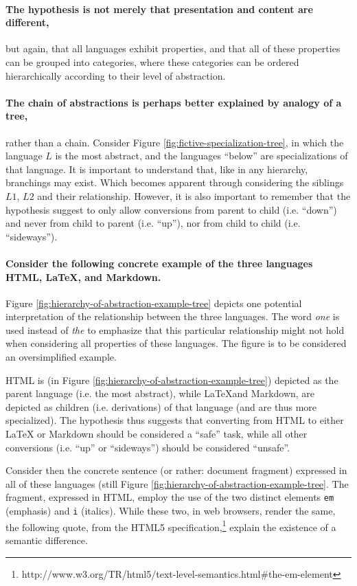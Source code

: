 \documentclass{scrreprt}
\begin{document}
\paragraph{The hypothesis is not merely that presentation and content are different,} but again, that all languages exhibit properties, and that all of these properties can be grouped into categories, where these categories can be ordered hierarchically according to their level of abstraction.

\paragraph{The chain of abstractions is perhaps better explained by analogy of a tree,} rather than a chain. Consider Figure \ref{fig:fictive-specialization-tree}, in which the language $L$ is the most abstract, and the languages ``below'' are specializations of that language. It is important to understand that, like in any hierarchy, branchings may exist. Which becomes apparent through considering the siblings $L1$, $L2$ and their relationship. However, it is also important to remember that the hypothesis suggest to only allow conversions from parent to child (i.e. ``down'') and never from child to parent (i.e. ``up''), nor from child to child (i.e. ``sideways'').

\paragraph{Consider the following concrete example of the three languages HTML, \LaTeX, and Markdown.} Figure \ref{fig:hierarchy-of-abstraction-example-tree} depicts one potential interpretation of the relationship between the three languages. The word \emph{one} is used instead of \emph{the} to emphasize that this particular relationship might not hold when considering all properties of these languages. The figure is to be considered an oversimplified example.

HTML is (in Figure \ref{fig:hierarchy-of-abstraction-example-tree}) depicted as the parent language (i.e. the most abstract), while \LaTeX and Markdown, are depicted as children (i.e. derivations) of that language (and are thus more specialized). The hypothesis thus suggests that converting from HTML to either \LaTeX{} or Markdown should be considered a ``safe'' task, while all other conversions (i.e. ``up'' or ``sideways'') should be considered ``unsafe''.

Consider then the concrete sentence (or rather: document fragment) expressed in all of these languages (still Figure \ref{fig:hierarchy-of-abstraction-example-tree}. The fragment, expressed in HTML, employ the use of the two distinct elements \texttt{em} (emphasis) and \texttt{i} (italics). While these two, in web browsers, render the same, the following quote, from the HTML5 specification,\footnote{http://www.w3.org/TR/html5/text-level-semantics.html\#the-em-element} explain the existence of a semantic difference.
\end{document}
